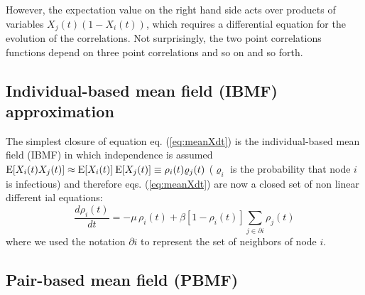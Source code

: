 However, the expectation value on the right hand side acts over products of variables $X_j(t) (1-X_i(t))$, which requires a differential equation for the evolution of the correlations. Not surprisingly, the two point correlations functions depend on three point correlations and so on and so forth. 


\subsection{Individual-based mean field (IBMF) approximation}


The simplest closure of equation eq.  (\ref{eq:meanXdt}) is the individual-based mean field (IBMF) in which independence is assumed $\mathrm{E}[X_i(t) X_j(t)] \approx \mathrm{E}[ X_i(t)] \: \mathrm{E} [ X_j(t)] \equiv \rho_i(t) \varrho_j(t)$ ($\varrho_{i}$ is the probability that node $i$ is infectious) and therefore eqs. (\ref{eq:meanXdt}) are now a closed set of non linear different ial equations:
\begin{equation}
\frac{d \rho_i(t)  }{dt}=-
 \mu \, \rho_i(t)  +\beta [1-\rho_i(t)] \sum_{j \in \partial i} 
\rho_j(t)
\label{eq:IBMFSISequations}
\end{equation}
where we used the notation $\partial i$ to represent the set of neighbors of node $i$.

\subsection{Pair-based mean field (PBMF)}

